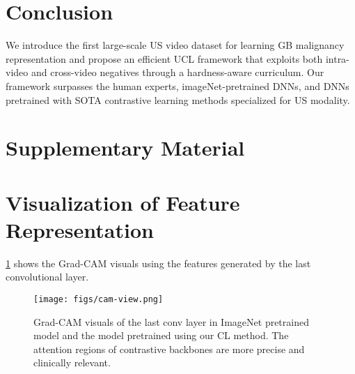\documentclass[runningheads]{llncs}
\newcommand{\beginsupplement}{%
        \setcounter{table}{0}
        \renewcommand{\thetable}{S\arabic{table}}%
        \setcounter{figure}{0}
        \renewcommand{\thefigure}{S\arabic{figure}}%
     }
\begin{document}
\section{Conclusion}
%
We introduce the first large-scale US video dataset for learning GB malignancy representation and propose an efficient UCL framework that exploits both intra-video and cross-video negatives through a hardness-aware curriculum. Our framework surpasses the human experts, imageNet-pretrained DNNs, and DNNs pretrained with SOTA contrastive learning methods specialized for US modality.

%
%
%



\section*{Supplementary Material}

\appendix
\beginsupplement
\section{Visualization of Feature Representation}
\cref{fig:cam_view} shows the Grad-CAM visuals using the features generated by the last convolutional layer. 
\begin{figure}[!h]
    \centering
    \texttt{[image: figs/cam-view.png]}
    \caption{Grad-CAM visuals of the last conv layer in ImageNet pretrained model and the model pretrained using our CL method. The attention regions of contrastive backbones are more precise and clinically relevant.}
    \label{fig:cam_view}
\end{figure}
%
\end{document}
